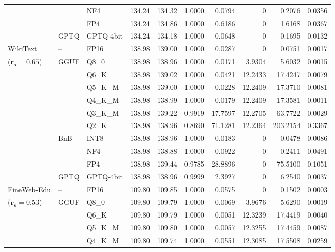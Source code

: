 \begin{table}[t]
{\begin{tabular}{ll l rrrrrrr}
 &  & NF4 & 134.24 & 134.32 & 1.0000 & 0.0794 & \cellcolor{cyan!12} $0$ & 0.2076 & 0.0356 \\
 &  & FP4 & 134.24 & 134.86 & 1.0000 & 0.6186 & \cellcolor{cyan!12} $0$ & 1.6168 & 0.0367 \\
 & GPTQ & GPTQ-4bit & 134.24 & 134.18 & 1.0000 & 0.0648 & \cellcolor{cyan!12} $0$ & 0.1695 & 0.0132 \\
\midrule
WikiText & -- & FP16 & 138.98 & 139.00 & 1.0000 & 0.0287 & \cellcolor{cyan!12} $0$ & 0.0751 & 0.0017 \\
{\small ($\mathbf{r_s{=}0.65}$)} & GGUF & Q8\_0 & 138.98 & 138.96 & 1.0000 & 0.0171 & 3.9304 & 5.6032 & 0.0015 \\
 &  & Q6\_K & 138.98 & 139.02 & 1.0000 & 0.0421 & 12.2433 & 17.4247 & 0.0079 \\
 &  & Q5\_K\_M & 138.98 & 139.00 & 1.0000 & 0.0228 & 12.2409 & 17.3710 & 0.0081 \\
 &  & Q4\_K\_M & 138.98 & 138.99 & 1.0000 & 0.0179 & 12.2409 & 17.3581 & 0.0011 \\
 &  & Q3\_K\_M & 138.98 & 139.22 & 0.9919 & 17.7597 & 12.2705 & 63.7722 & 0.0029 \\
 &  & Q2\_K & 138.98 & 138.96 & \cellcolor{red!18} 0.8690 & \cellcolor{red!18} 71.1281 & 12.2364 & \cellcolor{red!18} 203.2154 & \cellcolor{red!18} 0.3367 \\
 & BnB & INT8 & 138.98 & 138.96 & 1.0000 & 0.0183 & \cellcolor{cyan!12} $0$ & 0.0478 & 0.0086 \\
 &  & NF4 & 138.98 & 138.88 & 1.0000 & 0.0922 & \cellcolor{cyan!12} $0$ & 0.2411 & 0.0491 \\
 &  & FP4 & 138.98 & 139.44 & 0.9785 & 28.8896 & \cellcolor{cyan!12} $0$ & 75.5100 & 0.1051 \\
 & GPTQ & GPTQ-4bit & 138.98 & 138.96 & 0.9999 & 2.3927 & \cellcolor{cyan!12} $0$ & 6.2540 & 0.0037 \\
\midrule
FineWeb-Edu & -- & FP16 & 109.80 & 109.85 & 1.0000 & 0.0575 & \cellcolor{cyan!12} $0$ & 0.1502 & 0.0003 \\
{\small ($\mathbf{r_s{=}0.53}$)} & GGUF & Q8\_0 & 109.80 & 109.79 & 1.0000 & 0.0069 & 3.9676 & 5.6290 & 0.0019 \\
 &  & Q6\_K & 109.80 & 109.79 & 1.0000 & 0.0051 & 12.3239 & 17.4419 & 0.0040 \\
 &  & Q5\_K\_M & 109.80 & 109.80 & 1.0000 & 0.0057 & 12.3255 & 17.4459 & 0.0087 \\
 &  & Q4\_K\_M & 109.80 & 109.74 & 1.0000 & 0.0551 & 12.3085 & 17.5508 & 0.0259 \\

\end{tabular}}
\end{table}
